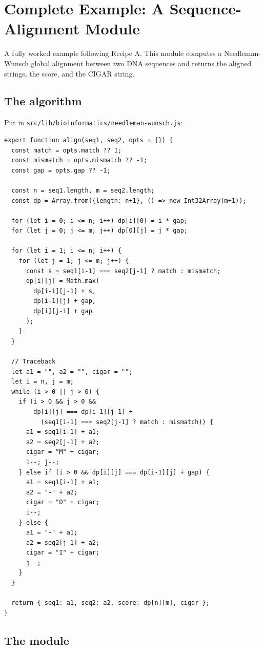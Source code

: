 \documentclass[11pt,a4paper]{article}
\theoremstyle{contract}
\begin{document}
\section{Complete Example: A Sequence-Alignment Module}
\label{sec:example}

A fully worked example following Recipe A. This module computes a
Needleman-Wunsch global alignment between two DNA sequences and returns
the aligned strings, the score, and the CIGAR string.

\subsection{The algorithm}

Put in \texttt{src/lib/bioinformatics/needleman-wunsch.js}:

\begin{lstlisting}
export function align(seq1, seq2, opts = {}) {
  const match = opts.match ?? 1;
  const mismatch = opts.mismatch ?? -1;
  const gap = opts.gap ?? -1;

  const n = seq1.length, m = seq2.length;
  const dp = Array.from({length: n+1}, () => new Int32Array(m+1));

  for (let i = 0; i <= n; i++) dp[i][0] = i * gap;
  for (let j = 0; j <= m; j++) dp[0][j] = j * gap;

  for (let i = 1; i <= n; i++) {
    for (let j = 1; j <= m; j++) {
      const s = seq1[i-1] === seq2[j-1] ? match : mismatch;
      dp[i][j] = Math.max(
        dp[i-1][j-1] + s,
        dp[i-1][j] + gap,
        dp[i][j-1] + gap
      );
    }
  }

  // Traceback
  let a1 = "", a2 = "", cigar = "";
  let i = n, j = m;
  while (i > 0 || j > 0) {
    if (i > 0 && j > 0 &&
        dp[i][j] === dp[i-1][j-1] +
          (seq1[i-1] === seq2[j-1] ? match : mismatch)) {
      a1 = seq1[i-1] + a1;
      a2 = seq2[j-1] + a2;
      cigar = "M" + cigar;
      i--; j--;
    } else if (i > 0 && dp[i][j] === dp[i-1][j] + gap) {
      a1 = seq1[i-1] + a1;
      a2 = "-" + a2;
      cigar = "D" + cigar;
      i--;
    } else {
      a1 = "-" + a1;
      a2 = seq2[j-1] + a2;
      cigar = "I" + cigar;
      j--;
    }
  }

  return { seq1: a1, seq2: a2, score: dp[n][m], cigar };
}
\end{lstlisting}

\subsection{The module}
\end{document}
